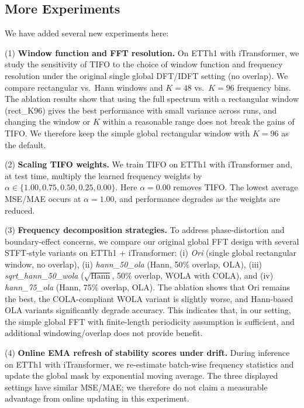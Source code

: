 \documentclass[sigconf,anonymous,review]{acmart}
\begin{document}
\subsection{More Experiments}

We have added several new experiments here:

(1) \textbf{Window function and FFT resolution.}
On ETTh1 with iTransformer, we study the sensitivity of TIFO to the choice of window function and frequency resolution under the original single global DFT/IDFT setting (no overlap).
We compare rectangular vs.\ Hann windows and $K=48$ vs.\ $K=96$ frequency bins. 
The ablation results show that using the full spectrum with a rectangular window (rect\_K96) gives the best performance with small variance across runs, and changing the window or $K$ within a reasonable range does not break the gains of TIFO. We therefore keep the simple global rectangular window with $K=96$ as the default.

(2) \textbf{Scaling TIFO weights.}
We train TIFO on ETTh1 with iTransformer and, at test time, multiply the learned frequency weights by $\alpha \in \{1.00, 0.75, 0.50, 0.25, 0.00\}$. Here $\alpha=0.00$ removes TIFO. The lowest average MSE/MAE occurs at $\alpha=1.00$, and performance degrades as the weights are reduced.

(3) \textbf{Frequency decomposition strategies.}
To address phase-distortion and boundary-effect concerns, we compare our original global FFT design with several STFT-style variants on ETTh1 + iTransformer: (i) \textit{Ori} (single global rectangular window, no overlap), (ii) \textit{hann\_50\_ola} (Hann, 50\% overlap, OLA), (iii) \textit{sqrt\_hann\_50\_wola} ($\sqrt{\text{Hann}}$, 50\% overlap, WOLA with COLA), and (iv) \textit{hann\_75\_ola} (Hann, 75\% overlap, OLA). The ablation shows that Ori remains the best, the COLA-compliant WOLA variant is slightly worse, and Hann-based OLA variants significantly degrade accuracy. This indicates that, in our setting, the simple global FFT with finite-length periodicity assumption is sufficient, and additional windowing/overlap does not provide benefit.

(4) \textbf{Online EMA refresh of stability scores under drift.}
During inference on ETTh1 with iTransformer, we re-estimate batch-wise
frequency statistics and update the global mask by exponential moving average.
The three displayed settings have similar MSE/MAE; we therefore do not claim a
measurable advantage from online updating in this experiment.
\end{document}
